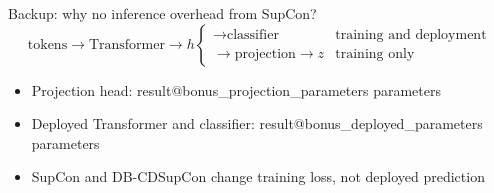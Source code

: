 \documentclass[aspectratio=169,12pt]{beamer}
\makeatletter
\newcommand{\Result}[1]{\csname result@#1\endcsname}
\makeatother
\begin{document}
\begin{frame}{Backup: why no inference overhead from SupCon?}
  \[
    \text{tokens}\rightarrow \text{Transformer}\rightarrow h
    \begin{cases}
      \rightarrow \text{classifier} & \text{training and deployment}\\
      \rightarrow \text{projection}\rightarrow z & \text{training only}
    \end{cases}
  \]
  \begin{itemize}
    \item Projection head: \Result{bonus_projection_parameters} parameters
    \item Deployed Transformer and classifier: \Result{bonus_deployed_parameters} parameters
    \item SupCon and DB-CDSupCon change training loss, not deployed prediction
  \end{itemize}
\end{frame}
\end{document}
